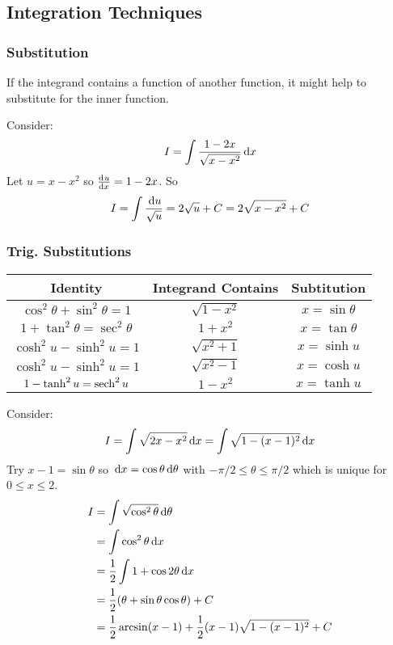 \documentclass[../main.tex]{subfiles}
\begin{document}
\subsection{Integration Techniques}
\subsubsection{Substitution}
If the integrand contains a function of another function, it might help to substitute for the inner function.
\begin{example}
  Consider:
  \[
    I = \int \frac{1-2x}{\sqrt{x - x^2}} \,\mathrm{d} x
  \]
  Let $u = x - x^2$ so $\deriv{u}{x} = 1 - 2x$.
  So
  \[
    I = \int \frac{\,\mathrm{d} u}{\sqrt{u}} = 2\sqrt{u} + C = 2\sqrt{x - x^2} + C
  \]
\end{example}
\subsubsection{Trig. Substitutions}
\begin{center}
\begin{tabular}{c|c|c}
Identity & Integrand Contains & Subtitution \\
\hline
$\cos^2 \theta  + \sin^2 \theta = 1$ & $\sqrt{1-x^2}$ & $x = \sin\theta$ \\
$1 + \tan^2 \theta = \sec^2 \theta$ & $1 + x^2$ & $x = \tan \theta$ \\
$\cosh^2u - \sinh^2u = 1$ & $\sqrt{x^2 + 1}$ & $x = \sinh u$ \\
$\cosh^2u - \sinh^2u = 1$ & $\sqrt{x^2 - 1}$ & $x = \cosh u$ \\
$1-\tanh^2u = \operatorname{sech}^2u$ & $1-x^2$ & $x = \tanh u$
\end{tabular}
\end{center}
\begin{example}
  Consider:
  \[
    I = \int \sqrt{2x - x^2} \,\mathrm{d} x = \int \sqrt{1 - (x-1)^2} \,\mathrm{d} x \\
  \]
  Try $x - 1 = \sin \theta$ so $\,\mathrm{d} x = \cos\theta \,\mathrm{d} \theta$ with $-\pi/2 \leq \theta \leq \pi/2$ which is unique for $0 \leq x \leq 2$.
  \begin{align*}
    I &= \int \sqrt{\cos^2\theta} \,\mathrm{d} \theta \\
      &= \int \cos^2 \theta \,\mathrm{d} x \\
      &= \frac{1}{2} \int 1 + \cos 2\theta \,\mathrm{d} x \\
      &= \frac{1}{2}(\theta + \sin\theta \cos \theta) + C \\
      &= \frac{1}{2} \arcsin(x-1) + \frac{1}{2}(x-1)\sqrt{1 - (x-1)^2} + C
  \end{align*}
\end{example}
\end{document}
